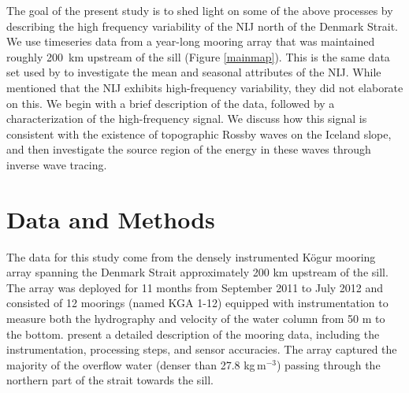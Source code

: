 \documentclass[12pt,titlepage,figuresatend]{article}
\begin{document}
The goal of the present study is to shed light on some of the above processes by describing the high frequency variability of the NIJ north of the Denmark Strait. We use timeseries data from a year-long mooring array that was maintained roughly 200~km upstream of the sill (Figure \ref{mainmap}). This is the same data set used by \cite{Harden2016} to investigate the mean and seasonal attributes of the NIJ. While \cite{Harden2016} mentioned that the NIJ exhibits high-frequency variability, they did not elaborate on this. We begin with a brief description of the data, followed by a characterization of the high-frequency signal. We discuss how this signal is consistent with the existence of topographic Rossby waves on the Iceland slope, and then investigate the source region of the energy in these waves through inverse wave tracing.


\section{Data and Methods}

The data for this study come from the densely instrumented K\"{o}gur mooring array spanning the Denmark Strait approximately 200 km upstream of the sill. The array was deployed for 11 months from September 2011 to July 2012 and consisted of 12 moorings (named KGA 1-12) equipped with instrumentation to measure both the hydrography and velocity of the water column from 50 m to the bottom. \cite{Harden2016} present a detailed description of the mooring data, including the instrumentation, processing steps, and sensor accuracies. The array captured the majority of the overflow water (denser than 27.8 kg$\,$m$^{-3}$) passing through the northern part of the strait towards the sill.
\end{document}
